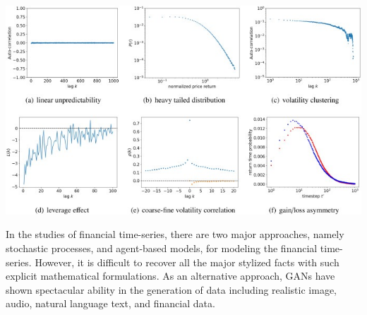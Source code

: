 \documentclass{article}
\begin{document}
    \begin{center}
        \includegraphics[scale = 0.7]{imgs/elisa/ts.jpg}
    \end{center}
    In the studies of financial time-series, there are two major approaches, namely stochastic processes, and agent-based models, for modeling the financial time-series. However, it is difficult to recover all the major stylized facts with such explicit mathematical formulations. As an alternative approach, GANs have shown spectacular ability in the generation of data including realistic image, audio, natural language text, and financial data.\\
    
\end{document}
